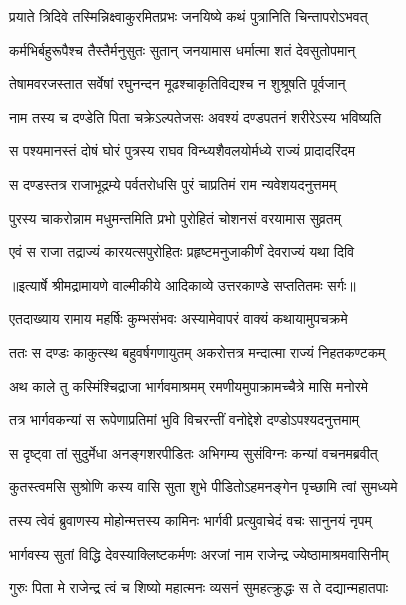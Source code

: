 \twolineshloka
{प्रयाते त्रिदिवे तस्मिन्निक्ष्वाकुरमितप्रभः}
{जनयिष्ये कथं पुत्रानिति चिन्तापरोऽभवत्} %

\twolineshloka
{कर्मभिर्बहुरूपैश्च तैस्तैर्मनुसुतः सुतान्}
{जनयामास धर्मात्मा शतं देवसुतोपमान्} %

\twolineshloka
{तेषामवरजस्तात सर्वेषां रघुनन्दन}
{मूढश्चाकृतिविद्यश्च न शुश्रूषति पूर्वजान्} %

\twolineshloka
{नाम तस्य च दण्डेति पिता चक्रेऽल्पतेजसः}
{अवश्यं दण्डपतनं शरीरेऽस्य भविष्यति} %

\twolineshloka
{स पश्यमानस्तं दोषं घोरं पुत्रस्य राघव}
{विन्ध्यशैवलयोर्मध्ये राज्यं प्रादादरिंदम} %

\twolineshloka
{स दण्डस्तत्र राजाभूद्रम्ये पर्वतरोधसि}
{पुरं चाप्रतिमं राम न्यवेशयदनुत्तमम्} %

\twolineshloka
{पुरस्य चाकरोन्नाम मधुमन्तमिति प्रभो}
{पुरोहितं चोशनसं वरयामास सुव्रतम्} %

\twolineshloka
{एवं स राजा तद्राज्यं कारयत्सपुरोहितः}
{प्रहृष्टमनुजाकीर्णं देवराज्यं यथा दिवि} %


{॥इत्यार्षे श्रीमद्रामायणे वाल्मीकीये आदिकाव्ये उत्तरकाण्डे सप्ततितमः सर्गः॥}


\twolineshloka
{एतदाख्याय रामाय महर्षिः कुम्भसंभवः}
{अस्यामेवापरं वाक्यं कथायामुपचक्रमे} %

\twolineshloka
{ततः स दण्डः काकुत्स्थ बहुवर्षगणायुतम्}
{अकरोत्तत्र मन्दात्मा राज्यं निहतकण्टकम्} %

\twolineshloka
{अथ काले तु कस्मिंश्चिद्राजा भार्गवमाश्रमम्}
{रमणीयमुपाक्रामच्चैत्रे मासि मनोरमे} %

\twolineshloka
{तत्र भार्गवकन्यां स रूपेणाप्रतिमां भुवि}
{विचरन्तीं वनोद्देशे दण्डोऽपश्यदनुत्तमाम्} %

\twolineshloka
{स दृष्ट्वा तां सुदुर्मेधा अनङ्गशरपीडितः}
{अभिगम्य सुसंविग्नः कन्यां वचनमब्रवीत्} %

\twolineshloka
{कुतस्त्वमसि सुश्रोणि कस्य वासि सुता शुभे}
{पीडितोऽहमनङ्गेन पृच्छामि त्वां सुमध्यमे} %

\twolineshloka
{तस्य त्वेवं ब्रुवाणस्य मोहोन्मत्तस्य कामिनः}
{भार्गवी प्रत्युवाचेदं वचः सानुनयं नृपम्} %

\twolineshloka
{भार्गवस्य सुतां विद्धि देवस्याक्लिष्टकर्मणः}
{अरजां नाम राजेन्द्र ज्येष्ठामाश्रमवासिनीम्} %

\twolineshloka
{गुरुः पिता मे राजेन्द्र त्वं च शिष्यो महात्मनः}
{व्यसनं सुमहत्क्रुद्धः स ते दद्यान्महातपाः} %

